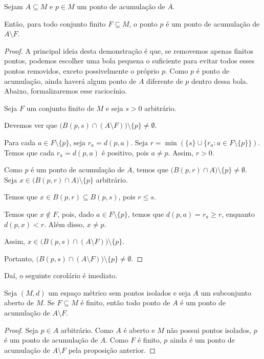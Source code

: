 \begin{proposition}\label{prop:pontoAcumulacaoRemocaoFinitos}
    Sejam $A\subseteq M$ e $p \in M$ um ponto de acumulação de $A$.

    Então, para todo conjunto finito $F\subseteq M$, o ponto $p$ é um ponto de acumulação de $A\setminus F$.
\end{proposition}
\begin{proof}
    A principal ideia desta demonstração é que, se removemos apenas finitos pontos, podemos escolher uma bola pequena o suficiente para evitar todos esses pontos removidos, exceto possivelmente o próprio $p$.
    Como $p$ é ponto de acumulação, ainda haverá algum ponto de $A$ diferente de $p$ dentro dessa bola.
    Abaixo, formalizaremos esse raciocínio.

    Seja $F$ um conjunto finito de $M$ e seja $s>0$ arbitrário.

    Devemos ver que $\bigl(B(p, s)\cap (A\setminus F)\bigr)\setminus\{p\}\neq \emptyset$.

    Para cada $a \in F\setminus\{p\}$, seja $r_a = d(p, a)$.
    Seja $r = \min(\{s\}\cup\{r_a : a \in F\setminus\{p\}\})$.
    Temos que cada $r_a=d(p, a)$ é positivo, pois $a\neq p$.
    Assim, $r>0$.

    Como $p$ é um ponto de acumulação de $A$, temos que $\bigl(B(p, r)\cap A\bigr)\setminus\{p\}\neq \emptyset$.
    Seja $x \in \bigl(B(p, r)\cap A\bigr)\setminus\{p\}$ arbitrário.

    Temos que $x\in B(p, r)\subseteq B(p, s)$, pois $r\leq s$.

    Temos que $x\notin F$, pois, dado $a \in F\setminus\{p\}$, temos que $d(p, a)=r_a\geq r$, enquanto $d(p, x)<r$.
    Além disso, $x\neq p$.

    Assim, $x \in \bigl(B(p, s)\cap (A\setminus F)\bigr)\setminus\{p\}$.

    Portanto, $\bigl(B(p, s)\cap (A\setminus F)\bigr)\setminus\{p\}\neq \emptyset$.
\end{proof}

Daí, o seguinte corolário é imediato.
\begin{corollary}
    Seja $(M,d)$ um espaço métrico sem pontos isolados e seja $A$ um subconjunto aberto de $M$.
    Se $F\subseteq M$ é finito, então todo ponto de $A$ é um ponto de acumulação de $A\setminus F$.
\end{corollary}
\begin{proof}
    Seja $p \in A$ arbitrário.
    Como $A$ é aberto e $M$ não possui pontos isolados, $p$ é um ponto de acumulação de $A$.
    Como $F$ é finito, $p$ ainda é um ponto de acumulação de $A\setminus F$ pela proposição anterior.
\end{proof}

